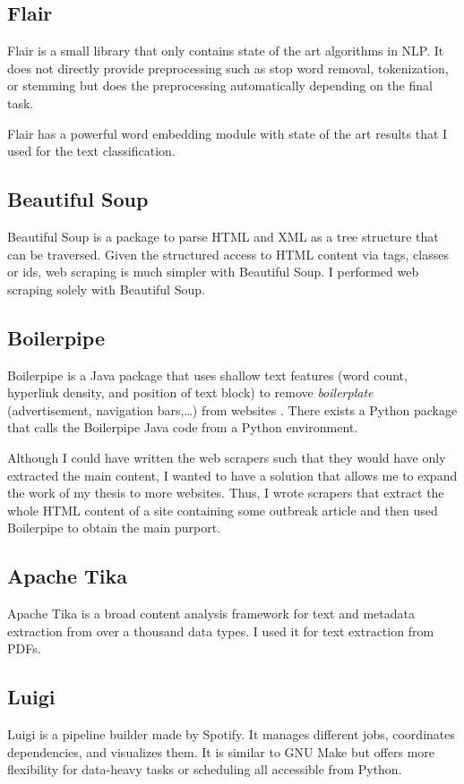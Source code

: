 \subsection{Flair}
Flair is a small library that only contains state of the art algorithms in NLP. It does not directly provide preprocessing such as stop word removal, tokenization, or stemming but does the preprocessing automatically depending on the final task.

Flair has a powerful word embedding module with state of the art results that I used for the text classification.

\subsection{Beautiful Soup}
Beautiful Soup is a package to parse HTML and XML as a tree structure that can be traversed. Given the structured access to HTML content via tags, classes or ids, web scraping is much simpler with Beautiful Soup.
I performed web scraping solely with Beautiful Soup.

\subsection{Boilerpipe}
Boilerpipe is a Java package that uses shallow text features (word count, hyperlink density, and position of text block) to remove \textsl{boilerplate} (advertisement, navigation bars,\dots) from websites \citep{Kohlschutter2010}. There exists a Python package that calls the Boilerpipe Java code from a Python environment.

Although I could have written the web scrapers such that they would have only extracted the main content, I wanted to have a solution that allows me to expand the work of my thesis to more websites. Thus, I wrote scrapers that extract the whole HTML content of a site containing some outbreak article and then used Boilerpipe to obtain the main purport.

\subsection{Apache Tika}\label{Tika}
Apache Tika is a broad content analysis framework for text and metadata extraction from over a thousand data types. I used it for text extraction from PDFs.

\subsection{Luigi}
Luigi is a pipeline builder made by Spotify. It manages different jobs, coordinates dependencies, and visualizes them. It is similar to GNU Make but offers more flexibility for data-heavy tasks or scheduling all accessible from Python.

